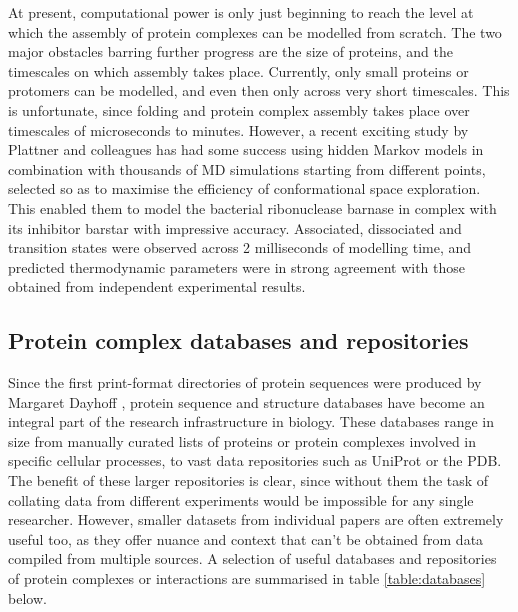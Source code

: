 \documentclass[a4paper,11pt,twoside,openright]{scrbook}
\begin{document}
At present, computational power is only just beginning to reach the level at
which the assembly of protein complexes can be modelled from scratch. The two
major obstacles barring further progress are the size of proteins, and the
timescales on which assembly takes place. Currently, only small proteins or
protomers can be modelled, and even then only across very short timescales. This
is unfortunate, since folding and protein complex assembly takes place over
timescales of microseconds to minutes. However, a recent exciting study by
Plattner and colleagues \cite{Plattner2017} has had some success using hidden
Markov models in combination with thousands of MD simulations starting from
different points, selected so as to maximise the efficiency of conformational
space exploration. This enabled them to model the bacterial ribonuclease barnase
in complex with its inhibitor barstar with impressive accuracy. Associated,
dissociated and transition states were observed across 2 milliseconds of
modelling time, and predicted thermodynamic parameters were in strong agreement
with those obtained from independent experimental results.

\subsection{Protein complex databases and repositories}
Since the first print-format directories of protein sequences were produced by
Margaret Dayhoff \cite{Dayhoff1965}, protein sequence and structure databases
have become an integral part of the research infrastructure in biology. These
databases range in size from manually curated lists of proteins or protein
complexes involved in specific cellular processes, to vast data repositories
such as UniProt or the PDB. The benefit of these larger repositories is clear,
since without them the task of collating data from different experiments would
be impossible for any single researcher. However, smaller datasets from
individual papers are often extremely useful too, as they offer nuance and
context that can't be obtained from data compiled from multiple sources. A
selection of useful databases and repositories of protein complexes or
interactions are summarised in table \ref{table:databases} below.
\end{document}
